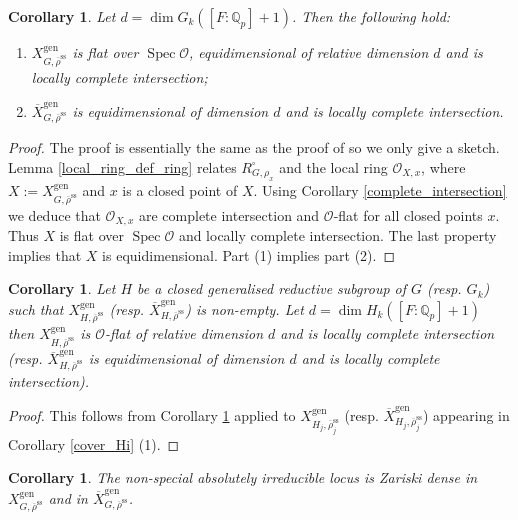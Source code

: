\documentclass{amsart}
\newtheorem{cor}[prop]{Corollary}
\theoremstyle{definition}
\theoremstyle{remark}
\DeclareMathOperator{\Spec}{Spec}
\newcommand{\Qp}{\mathbb {Q}_p}
\newcommand{\OO}{\mathcal O}
\newcommand{\rhobar}{\overline{\rho}}
\newcommand{\gen}{\mathrm{gen}}
\newcommand{\Xbar}{\overline{X}}
\newcommand{\rhobarss}{\rhobar^{\mathrm{ss}}}
\begin{document}
\begin{cor}\label{dim_XgenG} Let $d= \dim G_k([F:\Qp]+1)$. Then the following hold: 
\begin{enumerate} 
\item $X^{\gen}_{G, \rhobarss}$ is flat over $\Spec \OO$, equidimensional of relative
dimension $d$ and is locally complete intersection;
\item $\Xbar^{\gen}_{G, \rhobarss}$ is equidimensional of dimension $d$ and is locally complete 
intersection.
\end{enumerate} 
\end{cor}
\begin{proof} The proof is essentially the same as the proof of \cite[Corollary 3.40]{BIP_new} 
so we only give a sketch. Lemma \ref{local_ring_def_ring} relates $R^{\square}_{G, \rho_x}$ and the local ring 
$\OO_{X, x}$, where $X:=X^{\gen}_{G, \rhobarss}$ and $x$ is a closed point of $X$. 
Using Corollary \ref{complete_intersection} we deduce that $\OO_{X, x}$ are complete intersection 
and $\OO$-flat for all closed points $x$. Thus $X$ is flat over $\Spec \OO$ and locally complete 
intersection. The last property implies that $X$ is equidimensional. Part (1) implies part (2).
\end{proof} 

\begin{cor}\label{dim_XgenH} Let $H$ be a closed generalised reductive subgroup of $G$ (resp. $G_k$) such that 
$X^{\gen}_{H,\rhobarss}$ (resp. $\Xbar^{\gen}_{H, \rhobarss}$) is non-empty. 
Let $d=\dim H_k ([F:\Qp]+1)$ then $X^{\gen}_{H, \rhobarss}$ is $\OO$-flat of
relative dimension $d$ and is locally complete intersection (resp. 
$\Xbar^{\gen}_{H, \rhobarss}$ is equidimensional of dimension $d$ and is locally complete intersection).
\end{cor}
\begin{proof} This follows from Corollary \ref{dim_XgenG}  applied to $X^{\gen}_{H_j, \rhobarss_j}$ 
(resp. $\Xbar^{\gen}_{H_j, \rhobarss_j}$) appearing in  Corollary \ref{cover_Hi} (1).
\end{proof} 

\begin{cor}\label{non-spcl_dense} The non-special absolutely irreducible locus is Zariski dense in $X^{\gen}_{G, \rhobarss}$ and 
in $\Xbar^{\gen}_{G,\rhobarss}$.
\end{cor} 
\end{document}
